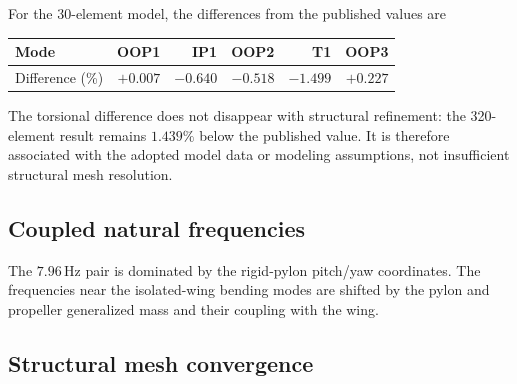 \documentclass[11pt,a4paper]{article}
\newcommand{\Hz}{\,\mathrm{Hz}}
\begin{document}
For the 30-element model, the differences from the published values are
\begin{center}
\begin{tabular}{lrrrrr}
\toprule
Mode & OOP1 & IP1 & OOP2 & T1 & OOP3\\
\midrule
Difference (\%) & \(+0.007\) & \(-0.640\) & \(-0.518\) & \(-1.499\) & \(+0.227\)\\
\bottomrule
\end{tabular}
\end{center}
The torsional difference does not disappear with structural refinement: the
320-element result remains \(1.439\%\) below the published value.  It is
therefore associated with the adopted model data or modeling assumptions,
not insufficient structural mesh resolution.

\subsection{Coupled natural frequencies}

\begin{table}[htbp]
\centering
\caption{First ten undamped coupled frequencies in Hz.}
\end{table}

The \(7.96\Hz\) pair is dominated by the rigid-pylon pitch/yaw coordinates.
The frequencies near the isolated-wing bending modes are shifted by the
pylon and propeller generalized mass and their coupling with the wing.

\subsection{Structural mesh convergence}
\end{document}
